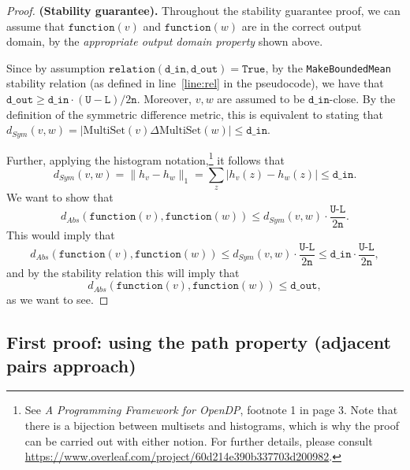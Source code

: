 \documentclass[11pt,a4paper]{article}
\theoremstyle{definition}
\newcommand{\MultiSet}{\mathrm{MultiSet}}
\newcommand{\din}{\texttt{d\_in}}
\newcommand{\dout}{\texttt{d\_out}}
\newcommand{\Relation}{\texttt{relation}}
\newcommand{\U}{\texttt{U}}
\newcommand{\True}{\texttt{True}}
\newcommand{\function}{\texttt{function}}
\begin{document}
\begin{proof}
    \smallskip
    \textbf{(Stability guarantee).} Throughout the stability guarantee proof, we can assume that $\function(v)$ and $\function(w)$ are in the correct output domain, by the \textit{appropriate output domain property} shown above. 
    
    Since by assumption $\Relation(\din, \dout) = \True$, by the \texttt{MakeBoundedMean} stability relation (as defined in line~\ref{line:rel} in the pseudocode), we have that $\dout \geq \din \cdot (\U - \texttt{L})/2\texttt{n}$. Moreover, $v, w$ are assumed to be $\din$-close. By the definition of the symmetric difference metric, this is equivalent to stating that $d_{Sym}(v, w) = |\MultiSet(v) \Delta \MultiSet(w)| \leq \din$.

    Further, applying the histogram notation,\footnote{See \textit{A Programming Framework for OpenDP}, footnote 1 in page 3. Note that there is a bijection between multisets and histograms, which is why the proof can be carried out with either notion. For further details, please consult \url{https://www.overleaf.com/project/60d214e390b337703d200982}.}  it follows that
    \[
        d_{Sym}(v, w) = \lVert h_{v} - h_{w}\rVert_1 = \sum_z |h_v(z) - h_w(z)| \leq \din.
    \]
    We want to show that
    \[
        d_{Abs}(\function(v), \function(w)) \leq d_{Sym}(v, w) \cdot \dfrac{\texttt{U-L}}{2\texttt{n}}.
    \]
    This would imply that
    \begin{equation}\label{eq:abs1}
        d_{Abs}(\function(v), \function(w)) \leq d_{Sym}(v, w) \cdot \dfrac{\texttt{U-L}}{2\texttt{n}} \leq \din \cdot \dfrac{\texttt{U-L}}{2\texttt{n}},
    \end{equation}
    and by the stability relation this will imply that
    \begin{equation}\label{eq:abs2}
        d_{Abs}(\function(v), \function(w)) \leq \dout,
    \end{equation}
    as we want to see. 
\end{proof}


\subsection{First proof: using the path property (adjacent pairs approach)}
\end{document}
